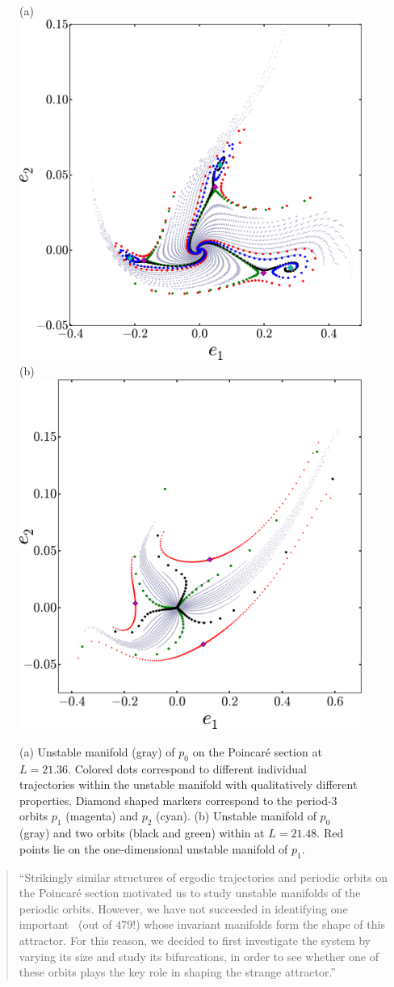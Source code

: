 \documentclass[12pt]{article}
\begin{document}
\begin{figure}[h]
    \centering
    (a) \includegraphics[height=0.45\textwidth]{UnstMan21p36png}
    (b) \includegraphics[height=0.45\textwidth]{UnstManPPO4L21p48png}
    \caption[Heteroclinic connections between \rpo s]{
        \label{f-Connections}
        (a) Unstable manifold (gray) of $p_{0}$ on the Poincar\'e
        section at $L=21.36$. Colored dots
        correspond to different individual trajectories within
        the unstable manifold with qualitatively different
        properties. Diamond shaped markers correspond to the
        period-3 orbits $p_{1}$ (magenta) and $p_{2}$ (cyan).
        (b) Unstable manifold of $p_{0}$ (gray) and two orbits
        (black and green) within at $L=21.48$. Red points lie on
        the one-dimensional unstable manifold of $p_{1}$.
    }
\end{figure}

\begin{quote}
    ``Strikingly similar structures of ergodic trajectories and periodic
orbits on the Poincar\'e section  motivated us
to study unstable manifolds of the periodic orbits. However, we have not
succeeded in identifying one important \rpo\ (out of $479$!) whose
invariant manifolds form the shape of this attractor.
For this reason, we decided to first investigate the system by varying
its size and study its bifurcations, in order to see whether one of
these orbits plays the key role in shaping the strange attractor.''
\end{quote}
\end{document}
